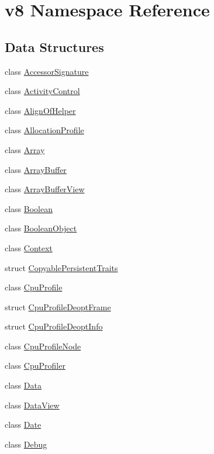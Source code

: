 \hypertarget{namespacev8}{}\section{v8 Namespace Reference}
\label{namespacev8}
\subsection*{Data Structures}
\begin{DoxyCompactItemize}
\item 
class \hyperlink{classv8_1_1AccessorSignature}{Accessor\+Signature}
\item 
class \hyperlink{classv8_1_1ActivityControl}{Activity\+Control}
\item 
class \hyperlink{classv8_1_1AlignOfHelper}{Align\+Of\+Helper}
\item 
class \hyperlink{classv8_1_1AllocationProfile}{Allocation\+Profile}
\item 
class \hyperlink{classv8_1_1Array}{Array}
\item 
class \hyperlink{classv8_1_1ArrayBuffer}{Array\+Buffer}
\item 
class \hyperlink{classv8_1_1ArrayBufferView}{Array\+Buffer\+View}
\item 
class \hyperlink{classv8_1_1Boolean}{Boolean}
\item 
class \hyperlink{classv8_1_1BooleanObject}{Boolean\+Object}
\item 
class \hyperlink{classv8_1_1Context}{Context}
\item 
struct \hyperlink{structv8_1_1CopyablePersistentTraits}{Copyable\+Persistent\+Traits}
\item 
class \hyperlink{classv8_1_1CpuProfile}{Cpu\+Profile}
\item 
struct \hyperlink{structv8_1_1CpuProfileDeoptFrame}{Cpu\+Profile\+Deopt\+Frame}
\item 
struct \hyperlink{structv8_1_1CpuProfileDeoptInfo}{Cpu\+Profile\+Deopt\+Info}
\item 
class \hyperlink{classv8_1_1CpuProfileNode}{Cpu\+Profile\+Node}
\item 
class \hyperlink{classv8_1_1CpuProfiler}{Cpu\+Profiler}
\item 
class \hyperlink{classv8_1_1Data}{Data}
\item 
class \hyperlink{classv8_1_1DataView}{Data\+View}
\item 
class \hyperlink{classv8_1_1Date}{Date}
\item 
class \hyperlink{classv8_1_1Debug}{Debug}

\end{DoxyCompactItemize}
